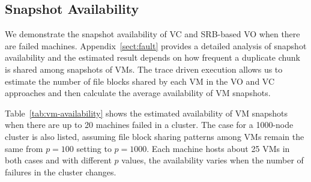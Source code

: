 



\subsection{Snapshot Availability}

We demonstrate  
the snapshot availability of VC and SRB-based VO  when there are failed machines. 
Appendix~\ref{sect:fault} provides a detailed analysis of 
snapshot availability and the estimated result depends on how frequent a duplicate chunk
is shared among snapshots of VMs.
The trace driven execution allows us to estimate the number of file blocks shared by each VM in the VO 
and VC approaches
and then calculate the average availability of VM snapshots.

Table~\ref{tab:vm-availability} shows the estimated availability of VM snapshots when 
there are up to 20 machines failed in a cluster. 
The case for  a 1000-node cluster is also listed, assuming file block sharing patterns among VMs remain
the same from $p=100$ setting to $p=1000$. Each machine hosts about 25 VMs in both cases
and with different $p$ values, the availability varies when the number of failures in the cluster changes.

